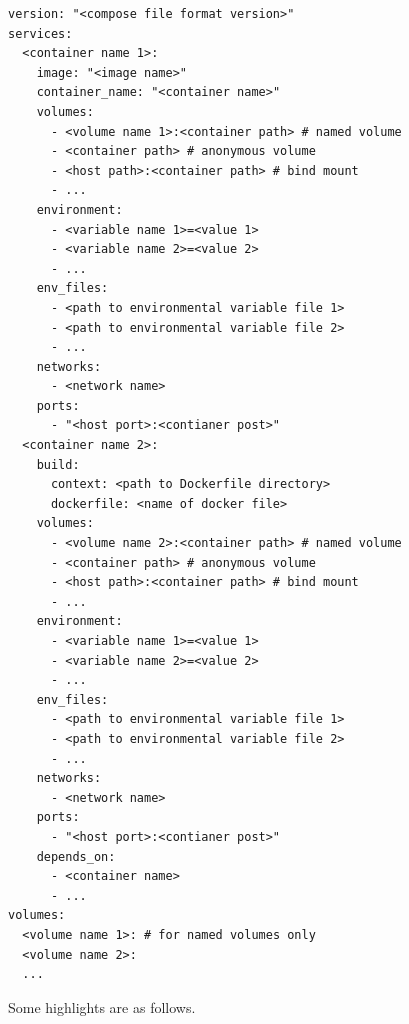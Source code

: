 \begin{lstlisting}
version: "<compose file format version>"
services:
  <container name 1>:
    image: "<image name>"
    container_name: "<container name>"
    volumes:
      - <volume name 1>:<container path> # named volume
      - <container path> # anonymous volume
      - <host path>:<container path> # bind mount
      - ...
    environment:
      - <variable name 1>=<value 1>
      - <variable name 2>=<value 2>
      - ...
    env_files:
      - <path to environmental variable file 1>
      - <path to environmental variable file 2>
      - ...
    networks:
      - <network name>
    ports:
      - "<host port>:<contianer post>"
  <container name 2>:
    build:
      context: <path to Dockerfile directory>
      dockerfile: <name of docker file>
    volumes:
      - <volume name 2>:<container path> # named volume
      - <container path> # anonymous volume
      - <host path>:<container path> # bind mount
      - ...
    environment:
      - <variable name 1>=<value 1>
      - <variable name 2>=<value 2>
      - ...
    env_files:
      - <path to environmental variable file 1>
      - <path to environmental variable file 2>
      - ...
    networks:
      - <network name>
    ports:
      - "<host port>:<contianer post>"
    depends_on:
      - <container name>
      - ...
volumes:
  <volume name 1>: # for named volumes only
  <volume name 2>:
  ...
\end{lstlisting}
Some highlights are as follows.
